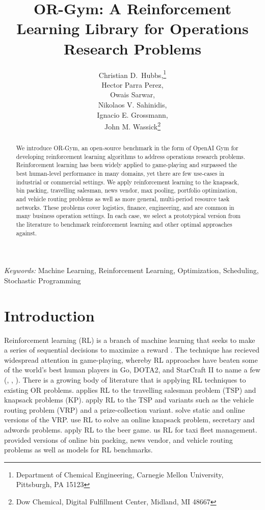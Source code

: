 \documentclass[12pt]{article}
\title{OR-Gym: A Reinforcement Learning Library for Operations Research Problems}
\author{
	Christian D.~Hubbs,\thanks{Department of Chemical Engineering, Carnegie Mellon University, Pittsburgh, PA 15123} \\
	Hector Parra Perez,\footnotemark[1] \\
	Owais Sarwar,\footnotemark[1]\\
	Nikolaos V. Sahinidis,\footnotemark[1] \\
	Ignacio E. Grossmann,\footnotemark[1] \\
	John M. Wassick\thanks{Dow Chemical, Digital Fulfillment Center, Midland, MI 48667}
}
\providecommand{\keywords}[1]{\textit{Keywords:} #1}
\begin{document}
\maketitle

\begin{abstract}
We introduce OR-Gym, an open-source benchmark in the form of OpenAI Gym for developing reinforcement learning algorithms to address operations research problems.
Reinforcement learning has been widely applied to game-playing and surpassed the best human-level performance in many domains, yet there are few use-cases in industrial or commercial settings.
We apply reinforcement learning to the knapsack, bin packing, travelling salesman, news vendor, max pooling, portfolio optimization, and vehicle routing problems as well as more general, multi-period resource task networks. 
These problems cover logistics, finance, engineering, and are common in many business operation settings.
In each case, we select a prototypical version from the literature to benchmark reinforcement learning and other optimal approaches against. 
\end{abstract}

\keywords{Machine Learning, Reinforcement Learning, Optimization, Scheduling, Stochastic Programming}

\section{Introduction}

Reinforcement learning (RL) is a branch of machine learning that seeks to make a series of sequential decisions to maximize a reward \citep{Sutton2018}.
The technique has recieved widespread attention in game-playing, whereby RL approaches have beaten some of the world's best human players in Go, DOTA2, and StarCraft II to name a few (\citet{Silver2017}, \citet{Berner2019a}, \citet{Vinyals2019}). 
There is a growing body of literature that is applying RL techniques to existing OR problems.
\citet{Bello2019} applies RL to the travelling salesman problem (TSP) and knapsack problems (KP). 
\citet{Kool2019} apply RL to the TSP and variants such as the vehicle routing problem (VRP) and a prize-collection variant. 
\citet{Nazari2018} solve static and online versions of the VRP.
\citet{Kong2019} use RL to solve an online knapsack problem, secretary and adwords problems.
\citet{Oroojlooyjadid2017} apply RL to the beer game.
\citet{Lin2018} us RL for taxi fleet management. 
\citet{Balaji2019} provided versions of online bin packing, news vendor, and vehicle routing problems as well as models for RL benchmarks.
\end{document}
